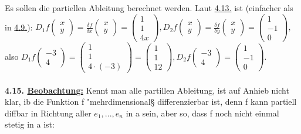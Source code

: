 \documentclass[]{scrartcl}
\begin{document}
Es sollen die partiellen Ableitung berechnet werden. Laut \ul{4.13.} ist 
(einfacher als in \ul{4.9.}): $D_1f\begin{pmatrix}
	x\\y
\end{pmatrix}=\frac{\delta  f}{\delta x}\begin{pmatrix}
	x\\y
\end{pmatrix}=\begin{pmatrix}
	1\\1\\4x
\end{pmatrix}, D_2f\begin{pmatrix}
	x\\y
\end{pmatrix}=\frac{\delta f}{\delta y}\begin{pmatrix}
	x\\y
\end{pmatrix}=\begin{pmatrix}
	1\\-1\\0
\end{pmatrix},$\\
also $D_1f\begin{pmatrix}
	-3\\4
\end{pmatrix}=\begin{pmatrix}
	1\\1\\4\cdot(-3)
\end{pmatrix}=\begin{pmatrix}
	1\\1\\12
\end{pmatrix}, D_2f\begin{pmatrix}
	-3\\4
\end{pmatrix}=\begin{pmatrix}
	1\\-1\\0
\end{pmatrix}.$\\
\\
\textbf{4.15. \underline{Beobachtung:}} Kennt man alle partillen Ableitung, ist 
auf Anhieb nicht klar, ib die Funktion f "mehrdimensional§ differenzierbar ist, 
denn f kann partiell diffbar in Richtung aller $e_1,...,e_n$ in a sein, aber 
so, dass f noch nicht einmal stetig in a ist:\\
\\
\end{document}

